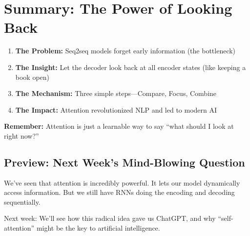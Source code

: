 \documentclass{article}
\begin{document}
\section{Summary: The Power of Looking Back}

\begin{tcolorbox}[colback=green!5!white, colframe=green!50!black, title=What We Learned Today]
\begin{enumerate}
\item \textbf{The Problem:} Seq2seq models forget early information (the bottleneck)
\item \textbf{The Insight:} Let the decoder look back at all encoder states (like keeping a book open)
\item \textbf{The Mechanism:} Three simple steps---Compare, Focus, Combine
\item \textbf{The Impact:} Attention revolutionized NLP and led to modern AI
\end{enumerate}

\textbf{Remember:} Attention is just a learnable way to say ``what should I look at right now?''
\end{tcolorbox}

\subsection{Preview: Next Week's Mind-Blowing Question}

We've seen that attention is incredibly powerful. It lets our model dynamically access information. But we still have RNNs doing the encoding and decoding sequentially.

\begin{center}
\end{center}

Next week: We'll see how this radical idea gave us ChatGPT, and why ``self-attention'' might be the key to artificial intelligence.
\end{document}
